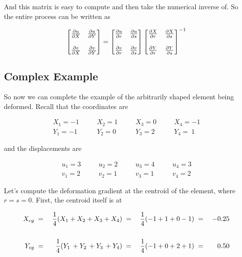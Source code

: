 And this matrix is easy to compute and then take the numerical inverse of.
So the entire process can be written as

\begin{eqnarray*}
\begin{bmatrix}
{\partial u \over \partial X} & {\partial u \over \partial Y} \\
\\
{\partial v \over \partial X} & {\partial v \over \partial Y} 
\end{bmatrix}
=
\begin{bmatrix}
{\partial u \over \partial r} & {\partial u \over \partial s} \\
\\
{\partial v \over \partial r} & {\partial v \over \partial s} 
\end{bmatrix}
\begin{bmatrix}
{\partial X \over \partial r} & {\partial X \over \partial s} \\
\\
{\partial Y \over \partial r} & {\partial Y \over \partial s} 
\end{bmatrix}^{-1}
\end{eqnarray*}

\subsection{Complex Example}
So now we can complete the example of the arbitrarily shaped element being deformed. Recall that the coordinates are

\begin{align*}
X_1 = -1  & \quad & X_2 = 1 & \quad & X_3 = 0 & \quad & X_4 = -1 \\
Y_1 = -1  & \quad & Y_2 = 0 & \quad & Y_3 = 2 & \quad & Y_4 = ~1
\end{align*}

and the displacements are

\begin{align*}
u_1 = 3  & \quad & u_2 = 2 & \quad & u_3 = 4 & \quad & u_4 = 3 \\
v_1 = 2  & \quad & v_2 = 1 & \quad & v_3 = 1 & \quad & v_4 = 2
\end{align*}

Let's compute the deformation gradient at the centroid of the element, where $ r = s = 0 $. First, the centroid itself is at

\begin{align*}
X_{cg} \; & = & \; {1 \over 4} (X_1 + X_2 + X_3 + X_4) \; & = & \; {1 \over 4} (-1 + 1 + 0 - 1) \; & = & \; -0.25
\\
\\
Y_{cg} \; & = & \; {1 \over 4} (Y_1 \, + Y_2 \, + Y_3 \, + Y_4) \; & = & \; {1 \over 4} (-1 + 0 + 2 + 1) \; & = & \; \;\; 0.50
\end{align*}

